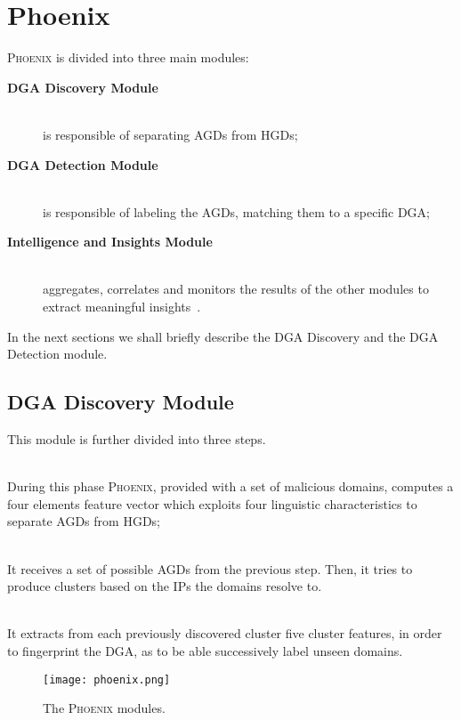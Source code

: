 \section{Phoenix}
\label{sec:previous_work}
\textsc{Phoenix} is divided into three main modules:
\begin{description}
  \item[\textbf{DGA Discovery Module}] \hfill \\ is responsible of separating AGDs from HGDs;
  \item[\textbf{DGA Detection Module}] \hfill \\ is responsible of labeling the AGDs, matching them
    to a specific DGA;
  \item[\textbf{Intelligence and Insights Module}] \hfill \\ aggregates, correlates and monitors the
    results of the other modules to extract meaningful insights~\cite{Lorenzo2013}.
\end{description}

In the next sections we shall briefly describe the DGA Discovery and the DGA Detection module.

\subsection{DGA Discovery Module} %
\label{ssub:dga_discovery_module}
This module is further divided into three steps.
\begin{description}
  \item[\textbf{AGD Filtering}] \hfill \\
    During this phase \textsc{Phoenix}, provided with a set of malicious domains,
    computes a four elements feature vector which exploits four linguistic characteristics
    to separate AGDs from HGDs;
  \item[\textbf{AGD Clustering}] \hfill \\
    It receives a set of possible AGDs from the previous step. Then, it tries to
    produce clusters based on the IPs the domains resolve to.
  \item[\textbf{DGA Fingerprinting}] \hfill \\
    It extracts from each previously discovered cluster five cluster features, in order
    to fingerprint the DGA, as to be able successively label unseen domains.
\end{description}

\begin{figure*}[h!tp]
  \texttt{[image: phoenix.png]}
  \caption{The \textsc{Phoenix} modules.}
  \label{fig:phoenix}
\end{figure*}

